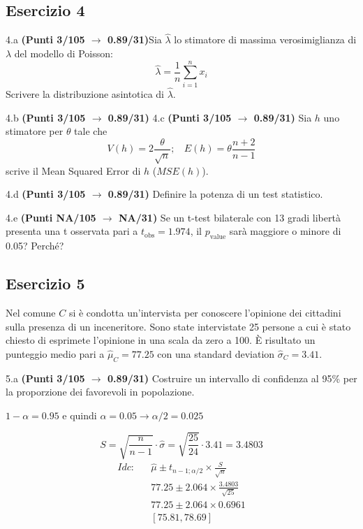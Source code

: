\documentclass[
  11pt,
]{book}
\theoremstyle{mytheoremstyle}
\theoremstyle{mydefstyle}
\newenvironment{sol}
  {
  \begin{tcolorbox}[enhanced,breakable,arc=0.1mm,boxrule=1pt,colback=white,colframe=iblue,
  title=\bf \fontfamily{lmss}\selectfont \hspace{.5 cm} Soluzione,drop fuzzy shadow]

}{
\end{tcolorbox}
  }
\begin{document}
\subsection{Esercizio 4}\label{esercizio-4-30}

4.a \textbf{(Punti 3/105 \(\rightarrow\) 0.89/31)}Sia \(\hat \lambda\) lo stimatore di massima verosimiglianza di \(\lambda\) del modello di Poisson:
\[\hat\lambda =  \frac 1n\sum_{i=1}^nx_i\]
Scrivere la distribuzione asintotica di \(\hat \lambda\).

4.b \textbf{(Punti 3/105 \(\rightarrow\) 0.89/31)} 4.c \textbf{(Punti 3/105 \(\rightarrow\) 0.89/31)} Sia \(h\) uno stimatore per \(\theta\) tale che
\[V(h)=2\frac\theta {\sqrt{n}};~~~~E(h)=\theta\frac{n+2}{n-1}\]
scrive il Mean Squared Error di \(h\) (\(MSE(h)\)).

4.d \textbf{(Punti 3/105 \(\rightarrow\) 0.89/31)} Definire la potenza di un test statistico.

4.e \textbf{(Punti NA/105 \(\rightarrow\) NA/31)} Se un t-test bilaterale con 13 gradi libertà presenta una
t osservata pari a \(t_\text{obs}=1.974\), il \(p_\text{value}\) sarà maggiore o minore di 0.05? Perché?

\subsection{Esercizio 5}\label{esercizio-5-28}

Nel comune \(C\) si è condotta un'intervista per conoscere l'opinione
dei cittadini sulla presenza di un inceneritore. Sono state intervistate
25 persone a cui è stato chiesto di esprimete l'opinione in una scala da zero a 100.
È risultato un punteggio medio pari a \(\hat\mu_C=77.25\) con una standard deviation
\(\hat\sigma_C=3.41\).

5.a \textbf{(Punti 3/105 \(\rightarrow\) 0.89/31)} Costruire un intervallo di confidenza al 95\%
per la proporzione dei favorevoli in popolazione.

\begin{sol}
\(1-\alpha =0.95\) e quindi \(\alpha=0.05\rightarrow \alpha/2=0.025\)

\[
      S  =\sqrt{\frac {n}{n-1}}\cdot\hat\sigma =
     \sqrt{\frac { 25 }{ 24 }}\cdot 3.41 = 3.4803 
\]
\begin{eqnarray*}
  Idc: & &  \hat\mu \pm  t_{n-1;\alpha/2} \times \frac{S}{\sqrt{n}} \\
     & &  77.25 \pm  2.064 \times \frac{ 3.4803 }{\sqrt{ 25 }} \\
     & &  77.25 \pm  2.064 \times  0.6961 \\
     & & [ 75.81 ,  78.69 ]
\end{eqnarray*}

\end{sol}
\end{document}
